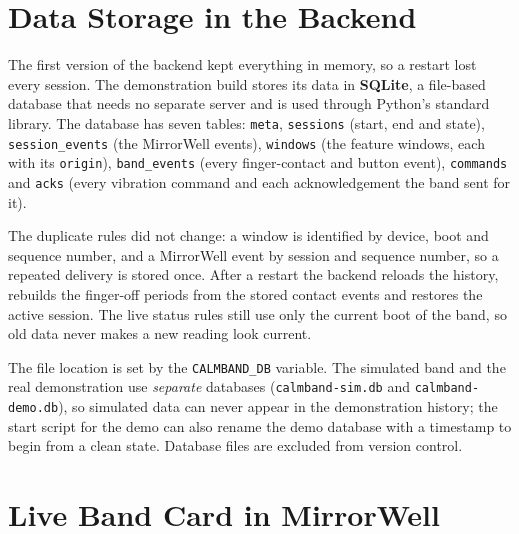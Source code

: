 \documentclass[12pt,letterpaper,oneside]{report}
\begin{document}
\section{Data Storage in the Backend}\label{sec:6.store}

The first version of the backend kept everything in memory, so a restart lost every session. The demonstration build stores its data in \textbf{SQLite}, a file-based database that needs no separate server and is used through Python's standard library. The database has seven tables: \texttt{meta}, \texttt{sessions} (start, end and state), \texttt{session\_events} (the MirrorWell events), \texttt{windows} (the feature windows, each with its \texttt{origin}), \texttt{band\_events} (every finger-contact and button event), \texttt{commands} and \texttt{acks} (every vibration command and each acknowledgement the band sent for it).

The duplicate rules did not change: a window is identified by device, boot and sequence number, and a MirrorWell event by session and sequence number, so a repeated delivery is stored once. After a restart the backend reloads the history, rebuilds the finger-off periods from the stored contact events and restores the active session. The live status rules still use only the current boot of the band, so old data never makes a new reading look current.

The file location is set by the \texttt{CALMBAND\_DB} variable. The simulated band and the real demonstration use \emph{separate} databases (\texttt{calmband-sim.db} and \texttt{calmband-demo.db}), so simulated data can never appear in the demonstration history; the start script for the demo can also rename the demo database with a timestamp to begin from a clean state. Database files are excluded from version control.

\section{Live Band Card in MirrorWell}\label{sec:6.live}
\end{document}
